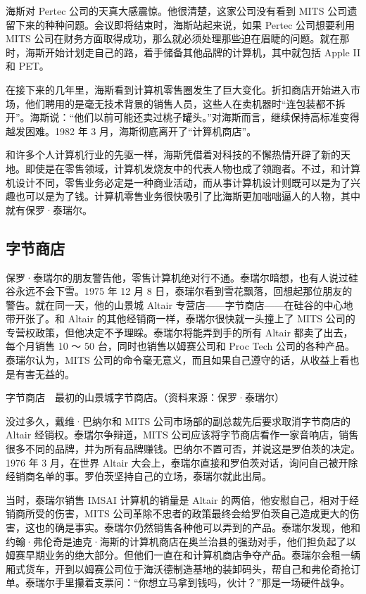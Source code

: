\documentclass[12pt,UTF8]{ctexbook}
\begin{document}
海斯对 Pertec 公司的天真大感震惊。他很清楚，这家公司没有看到 MITS 公司遗留下来的种种问题。会议即将结束时，海斯站起来说，如果 Pertec 公司想要利用 MITS 公司在财务方面取得成功，那么就必须处理那些迫在眉睫的问题。就在那时，海斯开始计划走自己的路，着手储备其他品牌的计算机，其中就包括 Apple II 和 PET。

在接下来的几年里，海斯看到计算机零售圈发生了巨大变化。折扣商店开始进入市场，他们聘用的是毫无技术背景的销售人员，这些人在卖机器时“连包装都不拆开”。海斯说：“他们以前可能还卖过桃子罐头。”对海斯而言，继续保持高标准变得越发困难。1982 年 3 月，海斯彻底离开了“计算机商店”。

和许多个人计算机行业的先驱一样，海斯凭借着对科技的不懈热情开辟了新的天地。即使是在零售领域，计算机发烧友中的代表人物也成了领跑者。不过，和计算机设计不同，零售业务必定是一种商业活动，而从事计算机设计则既可以是为了兴趣也可以是为了钱。计算机零售业务很快吸引了比海斯更加咄咄逼人的人物，其中就有保罗·泰瑞尔。





\subsection{字节商店}


保罗·泰瑞尔的朋友警告他，零售计算机绝对行不通。泰瑞尔暗想，也有人说过硅谷永远不会下雪。1975 年 12 月 8 日，泰瑞尔看到雪花飘落，回想起那位朋友的警告。就在同一天，他的山景城 Altair 专营店——字节商店——在硅谷的中心地带开张了。和 Altair 的其他经销商一样，泰瑞尔很快就一头撞上了 MITS 公司的专营权政策，但他决定不予理睬。泰瑞尔将能弄到手的所有 Altair 都卖了出去，每个月销售 10 ～ 50 台，同时也销售以姆赛公司和 Proc Tech 公司的各种产品。泰瑞尔认为，MITS 公司的命令毫无意义，而且如果自己遵守的话，从收益上看也是有害无益的。



字节商店　最初的山景城字节商店。（资料来源：保罗·泰瑞尔）

没过多久，戴维·巴纳尔和 MITS 公司市场部的副总裁先后要求取消字节商店的 Altair 经销权。泰瑞尔争辩道，MITS 公司应该将字节商店看作一家音响店，销售很多不同的品牌，并为所有品牌赚钱。巴纳尔不置可否，并说这是罗伯茨的决定。1976 年 3 月，在世界 Altair 大会上，泰瑞尔直接和罗伯茨对话，询问自己被开除经销商名单的事。罗伯茨坚持自己的立场，泰瑞尔就此出局。

当时，泰瑞尔销售 IMSAI 计算机的销量是 Altair 的两倍，他安慰自己，相对于经销商所受的伤害，MITS 公司革除不忠者的政策最终会给罗伯茨自己造成更大的伤害，这也的确是事实。泰瑞尔仍然销售各种他可以弄到的产品。泰瑞尔发现，他和约翰·弗伦奇是迪克·海斯的计算机商店在奥兰治县的强劲对手，他们担负起了以姆赛早期业务的绝大部分。但他们一直在和计算机商店争夺产品。泰瑞尔会租一辆厢式货车，开到以姆赛公司位于海沃德制造基地的装卸码头，帮自己和弗伦奇抢订单。泰瑞尔手里攥着支票问：“你想立马拿到钱吗，伙计？”那是一场硬件战争。
\end{document}
